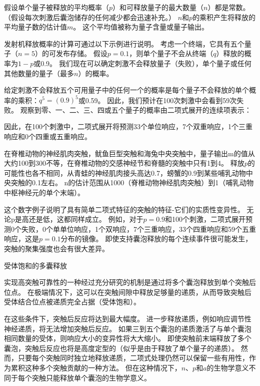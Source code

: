 \begin{proposition}[突触强度取决于递质释放的概率和其他量子参数]
	\quad \quad 假设单个量子被释放的平均概率（$ p $）和可释放量子的最大数量（$ n $）都是常数。
	（假设每次刺激后囊泡储存的任何减少都会迅速补充。）
	$ n $和$ p $的乘积产生将释放的平均量子数的估计值$ m $。
	这个平均值被称为量子含量或量子输出。
	
	\quad \quad 发射机释放概率的计算可通过以下示例进行说明。
	考虑一个终端，它具有五个量子（$ n=5 $）的可发布存储。
	假设$ p=0.1 $，则单个量子不会从终端（$ q $）释放的概率为$ 1-p $或0.9。
	我们现在可以确定刺激不会释放量子（失败），单个量子或任何其他数量的量子（最多$ n $）的概率。
	
	\quad \quad 给定刺激不会释放五个可用量子中的任何一个的概率是每个量子不会释放的单个概率的乘积：$ q^5 = (0.9)^5 $或0.59。
	因此，我们预计在100次刺激中会看到59次失败。
	观察到零、一、二、三、四或五个量子的概率由二项式展开的连续项表示：
	
	\quad \quad 因此，在100个刺激中，二项式展开将预测33个单位响应，7个双重响应，1个三重响应和0个四重或五重响应。
	
	\quad \quad 在脊椎动物的神经肌肉突触，鱿鱼巨型突触和海兔中央突触中，量子输出m的值从大约100到300不等，在脊椎动物的交感神经节和脊髓的突触中只有1到4。
	释放$ p $的可能性也各不相同，从青蛙的神经肌肉接头高达0.7，螃蟹的0.9到某些哺乳动物中央突触的0.1左右。
	n的估计范围从1000（脊椎动物神经肌肉突触）到1（哺乳动物中枢神经元的单个末端）。
	
	\quad \quad 这个数字例子说明了具有简单二项式特征的突触的特征-它们的实质性变异性。
	无论p是高还是低，这都同样成立。
	例如，对于$ p=0.9 $和100个刺激，二项式展开预测0个失败，0个单单位响应，1个双响应，7个三重响应，33个四重响应和59个五重响应，这是$ p=0.1 $分布的镜像。
	即使支持囊泡释放的每个连续事件很可能发生，突触的聚集强度也会有很大差异。
	
	\quad \quad 受体饱和的多囊释放
	
	\quad \quad 实现高突触可靠性的一种经过充分研究的机制是通过将多个囊泡释放到单个突触后位点。
	在极端情况下，这可以在突触间隙中释放足够量的递质，从而导致突触后受体结合位点被递质完全占据（受体饱和）。
	
	\quad \quad 在这些条件下，突触后反应将达到最大幅度。
	进一步释放递质，例如响应调节性神经递质，将无法增加突触后反应。
	如果三到五个囊泡的递质激活了与单个囊泡相同数量的受体，则响应大小的变异性将大大缩小。
	即使突触前末端释放了多个囊泡，突触后反应也将是高度定型的（似乎是由于释放了单个量子的递质）。
	然而，只要每个突触同时独立地释放递质，二项式处理仍然可以保留一些有用性，作为累积这种多个突触贡献的一种方法。
	但在这种情况下，$ n $、$ p $和$ a $的生物学意义不同于每个突触只能释放单个囊泡的生物学意义。
	
\end{proposition}



